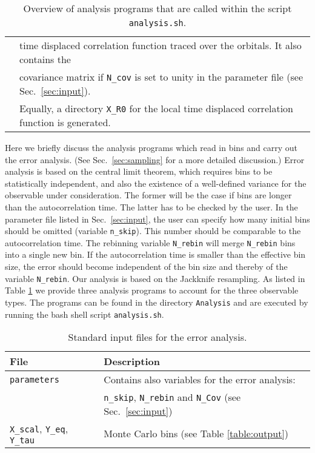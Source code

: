 \begin{table}[h]
\begin{tabular}{@{} l l @{}}
                           & time displaced correlation function traced over the  orbitals.  It also contains the  \\
                           & covariance matrix if \texttt{N\_cov} is set to unity in the parameter file  (see Sec.~\ref{sec:input}). \\
                           & Equally, a directory  \texttt{X\_R0}  for the local  time displaced  correlation function is generated. \\\bottomrule
   \end{tabular}
   \caption{ Overview of analysis programs that are called within the script \texttt{analysis.sh}. \label{table:analysis_programs}}
\end{table}
%
Here we briefly   discuss the analysis programs which read in bins and carry out the error analysis. (See Sec.~\ref{sec:sampling}  for a more detailed discussion.)
Error analysis   is based  on the central limit theorem,  which requires bins to be statistically independent, and also the existence of a well-defined variance  for the observable under consideration. 
The former will be the case if bins are  longer than the autocorrelation time.  The latter has to be checked by the user.  In the parameter file listed in Sec.~\ref{sec:input}, the user  can specify how many initial bins should be omitted (variable \texttt{n\_skip}). 
This  number should be comparable to the autocorrelation time.     
The  rebinning  variable \texttt{N\_rebin} will merge \texttt{N\_rebin}  bins into a single new bin. 
If the autocorrelation time  is smaller than the effective bin size, the error should become independent of the bin size and thereby of the variable \texttt{N\_rebin}.  
Our analysis is based on the Jackknife resampling.  
As listed in Table  \ref{table:analysis_programs}  we provide three analysis programs to account for the three observable types. The programs can be found in the directory \texttt{Analysis}  and   are executed by running the  bash shell script 
\texttt{analysis.sh}.
%
\begin{table}[h]
   \begin{tabular}{@{} l l @{}}\toprule
   File & Description \\\midrule
   \texttt{parameters}  &  Contains also variables for the error analysis:\\
   & \texttt{n\_skip}, \texttt{N\_rebin} and \texttt{N\_Cov} (see Sec.~\ref{sec:input}) \\
   \texttt{X\_scal}, \texttt{Y\_eq}, \texttt{Y\_tau} & Monte Carlo bins (see Table \ref{table:output}) \\\bottomrule
    \end{tabular}
   \caption{Standard input files for the error analysis. \label{table:analysis_input}}
\end{table}

